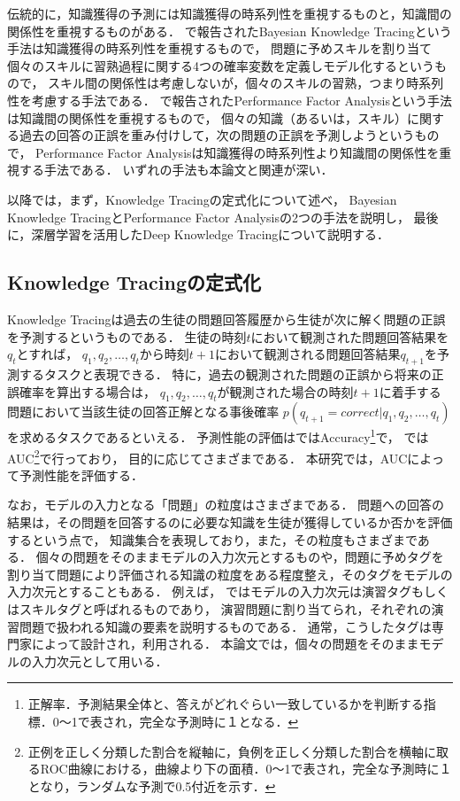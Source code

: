 伝統的に，知識獲得の予測には知識獲得の時系列性を重視するものと，知識間の関係性を重視するものがある．
\cite{corbett1994knowledge}で報告されたBayesian Knowledge Tracingという手法は知識獲得の時系列性を重視するもので，
問題に予めスキルを割り当て個々のスキルに習熟過程に関する4つの確率変数を定義しモデル化するというもので，
スキル間の関係性は考慮しないが，個々のスキルの習熟，つまり時系列性を考慮する手法である．
\cite{pavlik2009performance}で報告されたPerformance Factor Analysisという手法は知識間の関係性を重視するもので，
個々の知識（あるいは，スキル）に関する過去の回答の正誤を重み付けして，次の問題の正誤を予測しようというもので，
Performance Factor Analysisは知識獲得の時系列性より知識間の関係性を重視する手法である．
いずれの手法も本論文と関連が深い．


以降では，まず，Knowledge Tracingの定式化について述べ，
Bayesian Knowledge TracingとPerformance Factor Analysisの2つの手法を説明し，
最後に，深層学習を活用したDeep Knowledge Tracingについて説明する．


\subsection{Knowledge Tracingの定式化}
Knowledge Tracingは過去の生徒の問題回答履歴から生徒が次に解く問題の正誤を予測するというものである．
生徒の時刻$t$において観測された問題回答結果を$q_{t}$とすれば，
$q_1, q_2, \dots, q_t$から時刻$t+1$において観測される問題回答結果$q_{t+1}$を予測するタスクと表現できる．
特に，過去の観測された問題の正誤から将来の正誤確率を算出する場合は，
$q_1, q_2, \dots, q_t$が観測された場合の時刻$t+1$に着手する問題において当該生徒の回答正解となる事後確率
$p(q_{t+1} = correct|q_1, q_2, \dots, q_t)$を求めるタスクであるといえる．
予測性能の評価は\cite{yudelson2013individualized, falakmasir2015spectral}ではAccuracy\footnote{正解率．予測結果全体と、答えがどれぐらい一致しているかを判断する指標．0〜1で表され，完全な予測時に１となる．}で，
\cite{piech2015deep}ではAUC\footnote{正例を正しく分類した割合を縦軸に，負例を正しく分類した割合を横軸に取るROC曲線における，曲線より下の面積．0〜1で表され，完全な予測時に１となり，ランダムな予測で0.5付近を示す．}で行っており，
目的に応じてさまざまである．
本研究では，AUCによって予測性能を評価する．


なお，モデルの入力となる「問題」の粒度はさまざまである．
問題への回答の結果は，その問題を回答するのに必要な知識を生徒が獲得しているか否かを評価するという点で，
知識集合を表現しており，また，その粒度もさまざまである．
個々の問題をそのままモデルの入力次元とするものや，問題に予めタグを割り当て問題により評価される知識の粒度をある程度整え，そのタグをモデルの入力次元とすることもある．
例えば，
\cite{piech2015deep}ではモデルの入力次元は演習タグもしくはスキルタグと呼ばれるものであり，
演習問題に割り当てられ，それぞれの演習問題で扱われる知識の要素を説明するものである．
通常，こうしたタグは専門家によって設計され，利用される．
本論文では，個々の問題をそのままモデルの入力次元として用いる．


